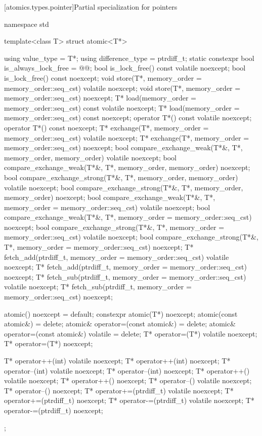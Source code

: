[atomics.types.pointer]{Partial specialization for pointers}
%

\begin{codeblock}
namespace std {
  template<class T> struct atomic<T*> {
    using value_type = T*;
    using difference_type = ptrdiff_t;
    static constexpr bool is_always_lock_free = @@;
    bool is_lock_free() const volatile noexcept;
    bool is_lock_free() const noexcept;
    void store(T*, memory_order = memory_order::seq_cst) volatile noexcept;
    void store(T*, memory_order = memory_order::seq_cst) noexcept;
    T* load(memory_order = memory_order::seq_cst) const volatile noexcept;
    T* load(memory_order = memory_order::seq_cst) const noexcept;
    operator T*() const volatile noexcept;
    operator T*() const noexcept;
    T* exchange(T*, memory_order = memory_order::seq_cst) volatile noexcept;
    T* exchange(T*, memory_order = memory_order::seq_cst) noexcept;
    bool compare_exchange_weak(T*&, T*, memory_order, memory_order) volatile noexcept;
    bool compare_exchange_weak(T*&, T*, memory_order, memory_order) noexcept;
    bool compare_exchange_strong(T*&, T*, memory_order, memory_order) volatile noexcept;
    bool compare_exchange_strong(T*&, T*, memory_order, memory_order) noexcept;
    bool compare_exchange_weak(T*&, T*,
                               memory_order = memory_order::seq_cst) volatile noexcept;
    bool compare_exchange_weak(T*&, T*,
                               memory_order = memory_order::seq_cst) noexcept;
    bool compare_exchange_strong(T*&, T*,
                                 memory_order = memory_order::seq_cst) volatile noexcept;
    bool compare_exchange_strong(T*&, T*,
                                 memory_order = memory_order::seq_cst) noexcept;
    T* fetch_add(ptrdiff_t, memory_order = memory_order::seq_cst) volatile noexcept;
    T* fetch_add(ptrdiff_t, memory_order = memory_order::seq_cst) noexcept;
    T* fetch_sub(ptrdiff_t, memory_order = memory_order::seq_cst) volatile noexcept;
    T* fetch_sub(ptrdiff_t, memory_order = memory_order::seq_cst) noexcept;

    atomic() noexcept = default;
    constexpr atomic(T*) noexcept;
    atomic(const atomic&) = delete;
    atomic& operator=(const atomic&) = delete;
    atomic& operator=(const atomic&) volatile = delete;
    T* operator=(T*) volatile noexcept;
    T* operator=(T*) noexcept;

    T* operator++(int) volatile noexcept;
    T* operator++(int) noexcept;
    T* operator--(int) volatile noexcept;
    T* operator--(int) noexcept;
    T* operator++() volatile noexcept;
    T* operator++() noexcept;
    T* operator--() volatile noexcept;
    T* operator--() noexcept;
    T* operator+=(ptrdiff_t) volatile noexcept;
    T* operator+=(ptrdiff_t) noexcept;
    T* operator-=(ptrdiff_t) volatile noexcept;
    T* operator-=(ptrdiff_t) noexcept;
  };
}
\end{codeblock}

